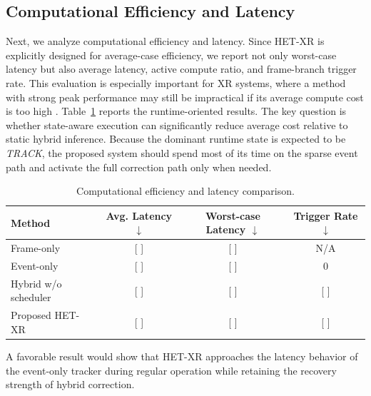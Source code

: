 \documentclass[journal]{IEEEtran}
\begin{document}
\subsection{Computational Efficiency and Latency}
Next, we analyze computational efficiency and latency. Since HET-XR is explicitly designed for average-case efficiency, we report not only worst-case latency but also average latency, active compute ratio, and frame-branch trigger rate. This evaluation is especially important for XR systems, where a method with strong peak performance may still be impractical if its average compute cost is too high \cite{chen2025ex,giordano2025sub,han2026janeeye}.
%
Table~\ref{tab:latency} reports the runtime-oriented results. The key question is whether state-aware execution can significantly reduce average cost relative to static hybrid inference. Because the dominant runtime state is expected to be \textit{TRACK}, the proposed system should spend most of its time on the sparse event path and activate the full correction path only when needed.
%
\begin{table}[t]
\small
\centering
\caption{Computational efficiency and latency comparison.}
\scriptsize
\label{tab:latency}
\centering
\begin{tabular}{lccc}
\hline
Method & Avg. Latency $\downarrow$ & Worst-case Latency $\downarrow$ & Trigger Rate $\downarrow$ \\
\hline
Frame-only & [ ] & [ ] & N/A \\
Event-only & [ ] & [ ] & 0 \\
Hybrid w/o scheduler & [ ] & [ ] & [ ] \\
Proposed HET-XR & [ ] & [ ] & [ ] \\
\hline
\end{tabular}
\end{table}
%
A favorable result would show that HET-XR approaches the latency behavior of the event-only tracker during regular operation while retaining the recovery strength of hybrid correction.
\end{document}
